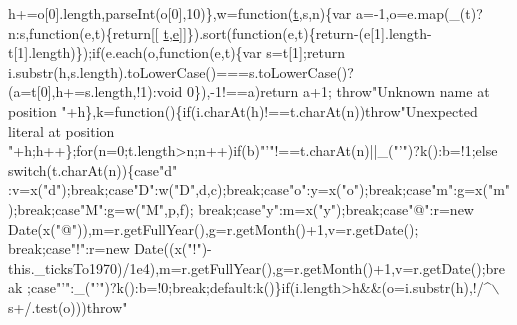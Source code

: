 \begin{DoxyCode}
      h+=o[0].length,parseInt(o[0],10)\},w=\textcolor{keyword}{function}(\hyperlink{jquery-2_80_83_8min_8js_aaccc9105df5383111407fd5b41255e23}{t},s,n)\{var a=-1,o=e.map(\_(t)?n:s,\textcolor{keyword}{function}(e,t)\{\textcolor{keywordflow}{return}[[
      \hyperlink{jquery-2_80_83_8min_8js_aaccc9105df5383111407fd5b41255e23}{t},\hyperlink{jquery-ui_8min_8js_a2c038346d47955cbe2cb91e338edd7e1}{e}]]\}).sort(\textcolor{keyword}{function}(e,t)\{\textcolor{keywordflow}{return}-(e[1].length-t[1].length)\});\textcolor{keywordflow}{if}(e.each(o,\textcolor{keyword}{function}(e,t)\{var s=t[1];\textcolor{keywordflow}{return}
       i.substr(h,s.length).toLowerCase()===s.toLowerCase()?(a=t[0],h+=s.length,!1):\textcolor{keywordtype}{void} 0\}),-1!==a)\textcolor{keywordflow}{return} a+1;\textcolor{keywordflow}{
      throw}\textcolor{stringliteral}{"Unknown name at position "}+h\},k=\textcolor{keyword}{function}()\{\textcolor{keywordflow}{if}(i.charAt(h)!==t.charAt(n))\textcolor{keywordflow}{throw}\textcolor{stringliteral}{"Unexpected literal at
       position "}+h;h++\};\textcolor{keywordflow}{for}(n=0;t.length>n;n++)\textcolor{keywordflow}{if}(b)\textcolor{stringliteral}{"'"}!==t.charAt(n)||\_(\textcolor{stringliteral}{"'"})?k():b=!1;\textcolor{keywordflow}{else} \textcolor{keywordflow}{switch}(t.charAt(n))\{\textcolor{keywordflow}{case}\textcolor{stringliteral}{"d"}
      :v=x(\textcolor{stringliteral}{"d"});\textcolor{keywordflow}{break};\textcolor{keywordflow}{case}\textcolor{stringliteral}{"D"}:w(\textcolor{stringliteral}{"D"},d,c);\textcolor{keywordflow}{break};\textcolor{keywordflow}{case}\textcolor{stringliteral}{"o"}:y=x(\textcolor{stringliteral}{"o"});\textcolor{keywordflow}{break};\textcolor{keywordflow}{case}\textcolor{stringliteral}{"m"}:g=x(\textcolor{stringliteral}{"m"});\textcolor{keywordflow}{break};\textcolor{keywordflow}{case}\textcolor{stringliteral}{"M"}:g=w(\textcolor{stringliteral}{"M"},p,f);\textcolor{keywordflow}{
      break};\textcolor{keywordflow}{case}\textcolor{stringliteral}{"y"}:m=x(\textcolor{stringliteral}{"y"});\textcolor{keywordflow}{break};\textcolor{keywordflow}{case}\textcolor{stringliteral}{"@"}:r=\textcolor{keyword}{new} Date(x(\textcolor{stringliteral}{"@"})),m=r.getFullYear(),g=r.getMonth()+1,v=r.getDate();\textcolor{keywordflow}{
      break};\textcolor{keywordflow}{case}\textcolor{stringliteral}{"!"}:r=\textcolor{keyword}{new} Date((x(\textcolor{stringliteral}{"!"})-this.\_ticksTo1970)/1e4),m=r.getFullYear(),g=r.getMonth()+1,v=r.getDate();\textcolor{keywordflow}{break}
      ;\textcolor{keywordflow}{case}\textcolor{stringliteral}{"'"}:\_(\textcolor{stringliteral}{"'"})?k():b=!0;\textcolor{keywordflow}{break};\textcolor{keywordflow}{default}:k()\}\textcolor{keywordflow}{if}(i.length>h&&(o=i.substr(h),!/^\(\backslash\)s+/.test(o)))\textcolor{keywordflow}{throw}\textcolor{stringliteral}{"
}
\end{DoxyCode}
